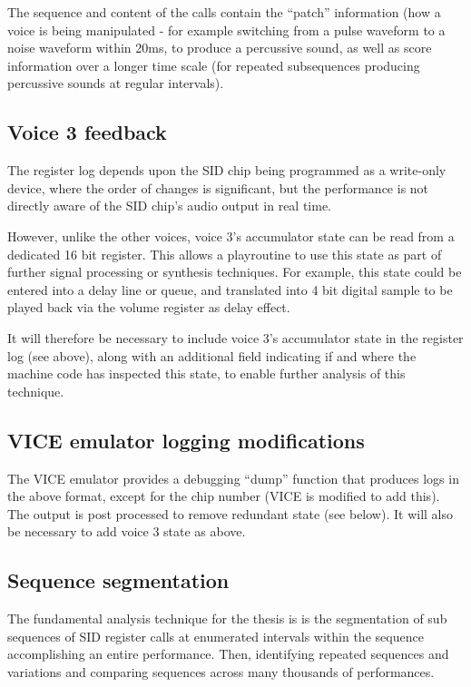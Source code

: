\documentclass[10pt]{article}
\begin{document}
\begin{multicols*}{2}
  The sequence and content of the calls contain the ``patch''
  information (how a voice is being manipulated - for example
  switching from a pulse waveform to a noise waveform within 20ms, to
  produce a percussive sound, as well as score information over a
  longer time scale (for repeated subsequences producing percussive
  sounds at regular intervals).

  \subsection{Voice 3 feedback}
  The register log depends upon the SID chip being programmed as a
  write-only device, where the order of changes is significant, but
  the performance is not directly aware of the SID chip's audio output
  in real time.

  However, unlike the other voices, voice 3's accumulator state can be
  read from a dedicated 16 bit register. This allows a playroutine to use
  this state as part of further signal processing or synthesis
  techniques. For example, this state could be entered into a delay
  line or queue, and translated into 4 bit digital sample to be played
  back via the volume register as delay effect.

  It will therefore be necessary to include voice 3's accumulator
  state in the register log (see above), along with an additional
  field indicating if and where the machine code has inspected this
  state, to enable further analysis of this technique.

  \subsection{VICE emulator logging modifications}
  The VICE emulator provides a debugging ``dump'' function that
  produces logs in the above format, except for the chip number
  (VICE is modified to add this).  The output is post processed
  to remove redundant state (see below).  It will also be
  necessary to add voice 3 state as above.

  \subsection{Sequence segmentation}
  The fundamental analysis technique for the thesis is
  is the segmentation of sub sequences of SID register calls at
  enumerated intervals within the sequence accomplishing an entire
  performance. Then, identifying repeated sequences and variations and
  comparing sequences across many thousands of performances.


\end{multicols*}
\end{document}
